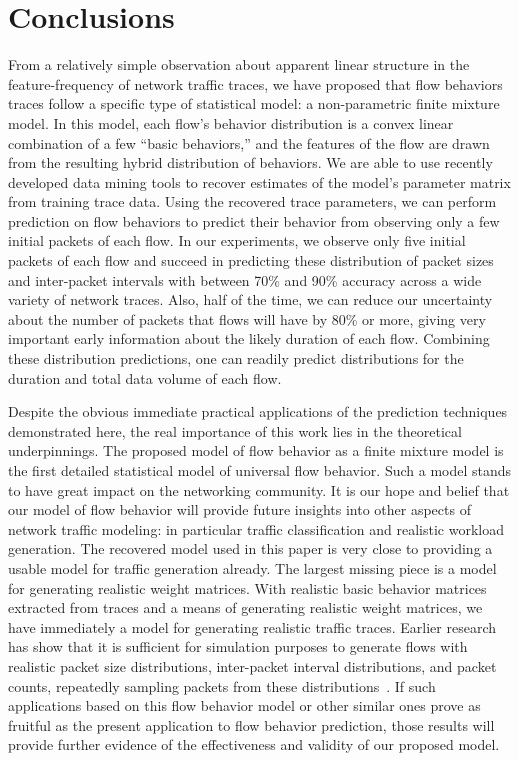 \documentclass{acm_proc_article-sp}
\begin{document}
\section{Conclusions}

From a relatively simple observation about apparent linear structure in the feature-frequency of network traffic traces, we have proposed that flow behaviors traces follow a specific type of statistical model:
a non-parametric finite mixture model.
In this model, each flow's behavior distribution is a convex linear combination of a few ``basic behaviors,'' and the features of the flow are drawn from the resulting hybrid distribution of behaviors.
We are able to use recently developed data mining tools to recover estimates of the model's parameter matrix from training trace data.
Using the recovered trace parameters, we can perform prediction on flow behaviors to predict their behavior from observing only a few initial packets of each flow.
In our experiments, we observe only five initial packets of each flow and succeed in predicting these distribution of packet sizes and inter-packet intervals with between 70\% and 90\% accuracy across a wide variety of network traces.
Also, half of the time, we can reduce our uncertainty about the number of packets that flows will have by 80\% or more, giving very important early information about the likely duration of each flow.
Combining these distribution predictions, one can readily predict distributions for the duration and total data volume of each flow.

Despite the obvious immediate practical applications of the prediction techniques demonstrated here, the real importance of this work lies in the theoretical underpinnings.
The proposed model of flow behavior as a finite mixture model is the first detailed statistical model of universal flow behavior.
Such a model stands to have great impact on the networking community.
It is our hope and belief that our model of flow behavior will provide future insights into other aspects of network traffic modeling:
in particular traffic classification and realistic workload generation.
The recovered model used in this paper is very close to providing a usable model for traffic generation already.
The largest missing piece is a model for generating realistic weight matrices.
With realistic basic behavior matrices extracted from traces and a means of generating realistic weight matrices, we have immediately a model for generating realistic traffic traces.
Earlier research has show that it is sufficient for simulation purposes to generate flows with realistic packet size distributions, inter-packet interval distributions, and packet counts, repeatedly sampling packets from these distributions~\cite{Karpinski07:realism,Karpinski07:cbr-failure}.
If such applications based on this flow behavior model or other similar ones prove as fruitful as the present application to flow behavior prediction, those results will provide further evidence of the effectiveness and validity of our proposed model.
\end{document}

